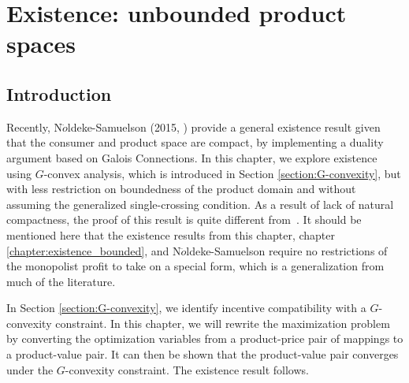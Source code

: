 \chapter{Existence: unbounded product spaces}\label{chapter:existence}




\section{Introduction}\label{section:introduction}

	
Recently, N$\ddot{o}$ldeke-Samuelson (2015, \cite{NoldekeSamuelson15p}) provide a general existence result given that the consumer and product space are compact, by implementing a duality argument based on Galois Connections.  In this chapter, we explore existence using $G$-convex analysis, which is introduced in  Section \ref{section:G-convexity}, but with less restriction on boundedness of the product domain and without assuming the generalized single-crossing condition. As a result of lack of natural compactness, the proof of this result is quite different from~\cite{NoldekeSamuelson15p}. It should be mentioned here that the existence results from this chapter,  chapter \ref{chapter:existence_bounded}, and N$\ddot{o}$ldeke-Samuelson require no restrictions of the monopolist profit to take on a special form, which is a generalization from much of the literature.\medskip

In Section \ref{section:G-convexity}, we identify incentive compatibility with a $G$-convexity constraint. In this chapter, we will rewrite the maximization problem by converting the optimization variables from a product-price pair of mappings to a product-value pair. It can then be shown that the product-value pair converges under the $G$-convexity constraint. The existence result follows. \medskip



